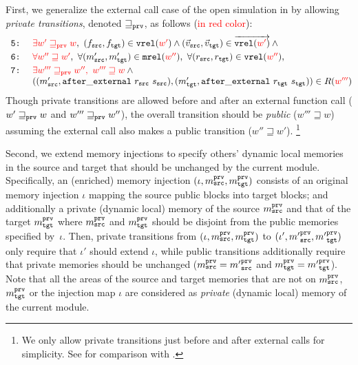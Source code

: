 {First, we generalize the external call case of the open simulation in 
by allowing \emph{private transitions}, denoted $\sqsupseteq_{\texttt{prv}}$,
as follows (\textcolor{red}{in red color}):
\[
\begin{array}{@{}l@{}}
\texttt{ 5:}~\quad \textcolor{red}{\exists w' \sqsupseteq_\weak w},~ (f_\src,f_\tgt)\in \texttt{vrel}(\textcolor{red}{w'}) \land (\vec{v}_\src,\vec{v}_\tgt) \in \overrightarrow{\texttt{vrel}(\textcolor{red}{w'})} \land{} \\[1mm]
\texttt{ 6:}~\quad \textcolor{red}{\forall w'' \sqsupseteq w'},~\forall (\memsrc',\memtgt')\in\texttt{mrel}(\textcolor{red}{w''}),~ \forall (r_\src,r_\tgt)\in \texttt{vrel}(\textcolor{red}{w''}),\\[1mm]
\texttt{ 7:}~\quad \textcolor{red}{\exists w''' \sqsupseteq_\weak w'',~ w''' \sqsupseteq w} \land {} \\
\phantom{\texttt{ 7:}}~\quad ((\memsrc',\mathtt{after\_external}~r_\src~\stsrc),(\memtgt',\mathtt{after\_external}~r_\tgt~\sttgt))\in R(\textcolor{red}{w'''})
\end{array}
\]
Though private transitions are allowed before and after an external function call (\ie
$w' \sqsupseteq_{\texttt{prv}} w$ and $w''' \sqsupseteq_{\texttt{prv}} w''$),
the overall transition should be \emph{public} (\ie $w''' \sqsupseteq w$)
assuming the external call also makes a public transition (\ie $w'' \sqsupseteq w'$).%
\footnote{We only allow private transitions just before and after external calls for simplicity.
See  for comparison with \cite{DBLP:conf/icfp/DreyerNB10,pb}.}

Second, we extend memory injections to specify others' dynamic local
memories in the source and target that should be unchanged by the current module.
Specifically, an (enriched) memory injection $(\iota, m^{\texttt{prv}}_{\texttt{src}}, m^{\texttt{prv}}_{\texttt{tgt}})$
consists of an original memory injection $\iota$ mapping the source public blocks into target blocks; and additionally
a private (\ie dynamic local) memory of the source $m^{\texttt{prv}}_{\texttt{src}}$ and that of the target $m^{\texttt{prv}}_{\texttt{tgt}}$
where $m^{\texttt{prv}}_{\texttt{src}}$ and $m^{\texttt{prv}}_{\texttt{tgt}}$ should be disjoint from the public memories specified by~$\iota$.
Then, private transitions from $(\iota, m^{\texttt{prv}}_{\texttt{src}}, m^{\texttt{prv}}_{\texttt{tgt}})$ to
$(\iota', {m'}^{\texttt{prv}}_{\texttt{src}}, {m'}^{\texttt{prv}}_{\texttt{tgt}})$ only require that $\iota'$ should extend $\iota$,
while public transitions additionally require that private memories should be unchanged
(\ie $m^{\texttt{prv}}_{\texttt{src}} = {m'}^{\texttt{prv}}_{\texttt{src}}$ and $m^{\texttt{prv}}_{\texttt{tgt}} = {m'}^{\texttt{prv}}_{\texttt{tgt}}$).
Note that all the areas of the source and target memories that are not on $m^{\texttt{prv}}_{\texttt{src}}$, $m^{\texttt{prv}}_{\texttt{tgt}}$ or the injection map $\iota$
are considered as \emph{private} (\ie dynamic local) memory of the current module.

}
